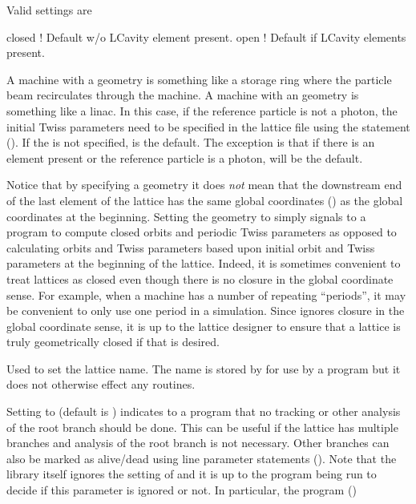 \begin{description}
Valid  settings are
\begin{example}
  closed  ! Default w/o LCavity element present.
  open    ! Default if LCavity elements present.
\end{example}
A machine with a  geometry is something like a storage ring where the particle beam
recirculates through the machine.  A machine with an  geometry is something like a linac.
In this case, if the reference particle is not a photon, the initial Twiss parameters need to be
specified in the lattice file using the  statement (). If the
 is not specified,  is the default. The exception is that if there is an
 element present or the reference particle is a photon,  will be the default.

Notice that by specifying a  geometry it does {\em not} mean that the downstream end of
the last element of the lattice has the same global coordinates () as the global
coordinates at the beginning. Setting the geometry to  simply signals to a program to
compute closed orbits and periodic Twiss parameters as opposed to calculating orbits and Twiss
parameters based upon initial orbit and Twiss parameters at the beginning of the lattice.  Indeed,
it is sometimes convenient to treat lattices as closed even though there is no closure in the global
coordinate sense. For example, when a machine has a number of repeating ``periods'', it may be
convenient to only use one period in a simulation. Since \bmad ignores closure in the global
coordinate sense, it is up to the lattice designer to ensure that a lattice is truly geometrically
closed if that is desired.
%
  \item[{parameter[lattice]}] \Newline
Used to set the lattice name. The  name is stored by \bmad for use by a program but it
does not otherwise effect any \bmad routines.
%
  \item[{parameter[live_branch]}] \Newline
Setting  to  (default is ) indicates to a program that no
tracking or other analysis of the root branch should be done. This can be useful if the lattice has
multiple branches and analysis of the root branch is not necessary. Other branches can also be
marked as alive/dead using line parameter statements (). Note that the \bmad
library itself ignores the setting of  and it is up to the program being run to
decide if this parameter is ignored or not. In particular, the \tao program ()

\end{description}
